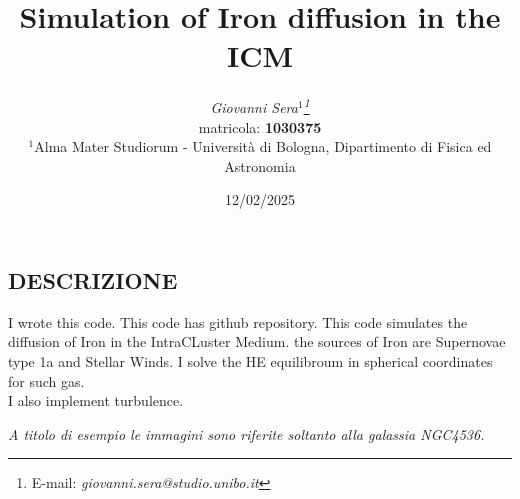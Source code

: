 \documentclass{article}
\title{\Large \textbf{Simulation of Iron diffusion in the ICM}
}
\author{
\large \emph{Giovanni Sera$^{1}$\thanks{E-mail: \emph{giovanni.sera@studio.unibo.it}}}
\\ 
\small matricola:\textbf{ 1030375}
\\
\footnotesize $^{1}$Alma Mater Studiorum - Università di Bologna, Dipartimento di Fisica ed Astronomia
}
\date{\small{12/02/2025}}
\numberwithin{equation}{subsection}
\begin{document}
\pagestyle{fancy}

\maketitle
{}

\begin{center}
\section{DESCRIZIONE}
\vspace{0.1 cm}
I wrote this code. This code has github repository.
This code simulates the diffusion of Iron in 
the IntraCLuster Medium. the sources of Iron are
Supernovae type 1a and Stellar Winds. I solve
the HE equilibroum in spherical coordinates for 
such gas.\\
I also implement turbulence.
\end{center}
{\footnotesize \textit{A titolo di esempio le immagini sono riferite soltanto alla galassia NGC4536.}}
\end{document}
